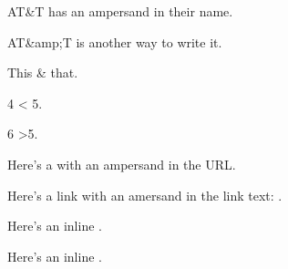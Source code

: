 AT&T has an ampersand in their name.

AT&amp;T is another way to write it.

This & that.

4 < 5.

6 \textgreater 5.

Here's a  with an ampersand in the URL.

Here's a link with an amersand in the link text: .

Here's an inline .

Here's an inline .